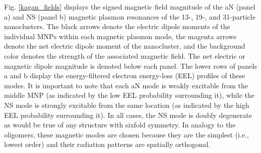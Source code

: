 \documentclass[journal=apchd5,manuscript=article]{achemso}
\begin{document}
Fig. \ref{kagan_fields} displays the signed magnetic field magnitude of the aN (panel a) and NS (panel b) magnetic plasmon resonances of the 13-, 19-, and 31-particle nanoclusters. The black arrows denote the electric dipole moments of the individual MNPs within each magnetic plasmon mode, the magenta arrows denote the net electric dipole moment of the nanocluster, and the background color denotes the strength of the associated magnetic field. The net electric or magnetic dipole magnitude is denoted below each panel. The lower rows of panels a and b display the energy-filtered electron energy-loss (EEL) profiles of these modes. It is important to note that each aN mode is weakly excitable from the middle MNP (as indicated by the low EEL probability surrounding it), while the NS mode is strongly excitable from the same location (as indicated by the high EEL probability surrounding it). In all cases, the NS mode is doubly degenerate as would be true of any structure with sixfold symmetry. In analogy to the oligomers, these magnetic modes are chosen because they are the simplest (i.e., lowest order) and their radiation patterns are spatially orthogonal. 
\end{document}
